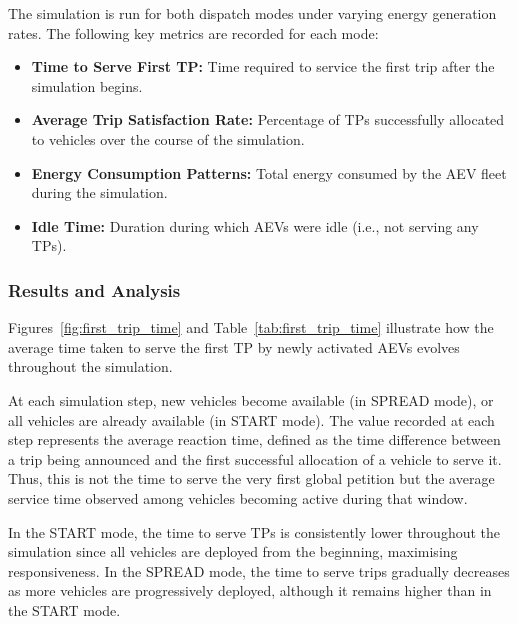 The simulation is run for both dispatch modes under varying energy generation rates. The following key metrics are recorded for each mode:
\begin{itemize}
    \item \textbf{Time to Serve First TP:} Time required to service the first trip after the simulation begins.
    \item \textbf{Average Trip Satisfaction Rate:} Percentage of TPs successfully allocated to vehicles over the course of the simulation.
    \item \textbf{Energy Consumption Patterns:} Total energy consumed by the AEV fleet during the simulation.
    \item \textbf{Idle Time:} Duration during which AEVs were idle (i.e., not serving any TPs).
\end{itemize}

\subsubsection{Results and Analysis}

Figures~\ref{fig:first_trip_time} and Table~\ref{tab:first_trip_time} illustrate how the average time taken to serve the first TP by newly activated AEVs evolves throughout the simulation.

At each simulation step, new vehicles become available (in SPREAD mode), or all vehicles are already available (in START mode). The value recorded at each step represents the average reaction time, defined as the time difference between a trip being announced and the first successful allocation of a vehicle to serve it. Thus, this is not the time to serve the very first global petition but the average service time observed among vehicles becoming active during that window.

In the START mode, the time to serve TPs is consistently lower throughout the simulation since all vehicles are deployed from the beginning, maximising responsiveness. In the SPREAD mode, the time to serve trips gradually decreases as more vehicles are progressively deployed, although it remains higher than in the START mode.

